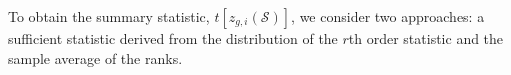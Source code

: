 \documentclass[12pt]{article}
\theoremstyle{plain}
\theoremstyle{remark}
\begin{document}
	 To obtain the summary statistic, $t[z_{g,i}(\mathcal{S})]$, we consider two approaches: a sufficient statistic derived from the distribution of the $r$th order statistic and the sample average of the ranks.
		

\end{document}

